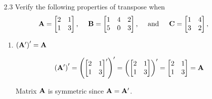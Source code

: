 \begin{enumerate}[font=\bfseries]
\begin{enumerate}
        \end{enumerate}
        \item[2.3] 
        Verify the following properties of transpose when
        \[
            \bold{A} = \begin{bmatrix}
                2 & 1 \\
                1 & 3
            \end{bmatrix}\text{,}\hspace{0.2in}
            \bold{B} = \begin{bmatrix}
                1 & 4 & 2 \\
                5 & 0 & 3
            \end{bmatrix}\text{,}\hspace{0.2in}\text{and}\hspace{0.2in}
            \bold{C} = \begin{bmatrix}
                1 & 4 \\
                3 & 2
            \end{bmatrix},
        \]
        \begin{enumerate}
            \item ${\left(\bold{A}^\prime\right)}^\prime = \bold{A}$
            

            \[
                {\left(\bold{A}^\prime\right)}^\prime = 
                {\left(
                    \begin{bmatrix}
                        2 & 1 \\
                        1 & 3
                    \end{bmatrix}^\prime
                    \right)}^\prime =
                {\left(
                    \begin{bmatrix}
                        2 & 1 \\
                        1 & 3
                    \end{bmatrix}
                    \right)}^\prime = 
                    \begin{bmatrix}
                        2 & 1 \\
                        1 & 3
                    \end{bmatrix} =
                    \bold{A}
            \]

            Matrix $\bold{A}$ is symmetric since $\bold{A} = \bold{A}^\prime$.



\end{enumerate}
\end{enumerate}
